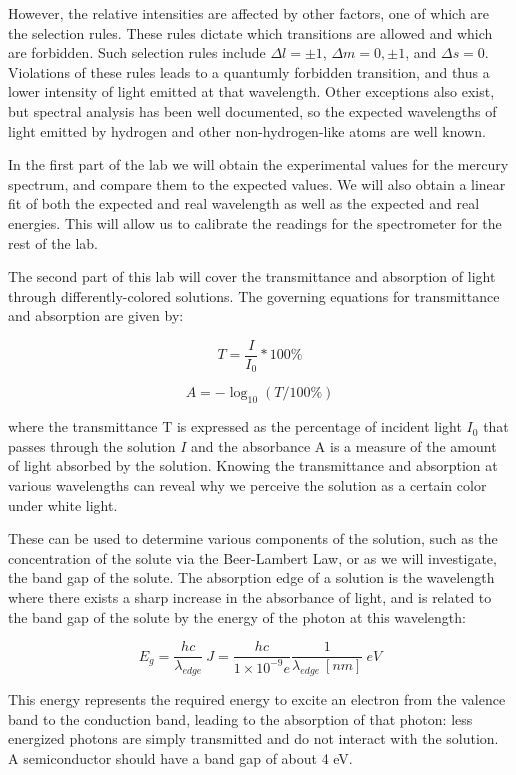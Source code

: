 However, the relative intensities are affected by other factors, one of which are the selection rules. These rules dictate which transitions are allowed and which are forbidden. Such selection rules include $\Delta l = \pm 1$, $\Delta m = 0, \pm 1$, and $\Delta s = 0$. Violations of these rules leads to a quantumly forbidden transition, and thus a lower intensity of light emitted at that wavelength. Other exceptions also exist, but spectral analysis has been well documented, so the expected wavelengths of light emitted by hydrogen and other non-hydrogen-like atoms are well known.


In the first part of the lab we will obtain the experimental values for the mercury spectrum, and compare them to the expected values. We will also obtain a linear fit of both the expected and real wavelength as well as the expected and real energies.
This will allow us to calibrate the readings for the spectrometer for the rest of the lab.

The second part of this lab will cover the transmittance and absorption of light through differently-colored solutions. The governing equations for transmittance and absorption are given by:

\begin{equation}
   T = \frac{I}{I_0} * 100\%
\end{equation}

\begin{equation}
   A = -\log_{10}(T/100\%)
   \label{eq:absorbance}
\end{equation}

where the transmittance T is expressed as the percentage of incident light $I_0$ that passes through the solution $I$ and the absorbance A is a measure of the amount of light absorbed by the solution. Knowing the transmittance and absorption at various wavelengths can reveal why we perceive the solution as a certain color under white light.

These can be used to determine various components of the solution, such as the concentration of the solute via the Beer-Lambert Law, or as we will investigate, the band gap of the solute. The absorption edge of a solution is the wavelength where there exists a sharp increase in the absorbance of light, and is related to the band gap of the solute by the energy of the photon at this wavelength:

\begin{equation}
   E_g = \frac{hc}{\lambda_{edge}}~J = \frac{hc}{1\times10^{-9} e} \frac{1}{\lambda_{edge}~[nm]} ~eV
\end{equation}

This energy represents the required energy to excite an electron from the valence band to the conduction band, leading to the absorption of that photon: less energized photons are simply transmitted and do not interact with the solution. A semiconductor should have a band gap of about 4 eV.